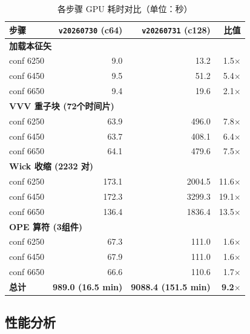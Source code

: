 \documentclass[12pt,a4paper]{ctexart}
\begin{document}
\begin{table}[H]
\centering
\caption{各步骤 GPU 耗时对比（单位：秒）}
\begin{tabular}{lrrr}
\toprule
步骤 & \texttt{v20260730} (c64) & \texttt{v20260731} (c128) & 比值 \\
\midrule
\multicolumn{4}{l}{\textbf{加载本征矢}} \\
\quad conf 6250 & 9.0 & 13.2 & 1.5$\times$ \\
\quad conf 6450 & 9.5 & 51.2 & 5.4$\times$ \\
\quad conf 6650 & 9.4 & 19.6 & 2.1$\times$ \\
\midrule
\multicolumn{4}{l}{\textbf{VVV 重子块 (72个时间片)}} \\
\quad conf 6250 & 63.9 & 496.0 & 7.8$\times$ \\
\quad conf 6450 & 63.7 & 408.1 & 6.4$\times$ \\
\quad conf 6650 & 64.1 & 479.6 & 7.5$\times$ \\
\midrule
\multicolumn{4}{l}{\textbf{Wick 收缩 (2232 对)}} \\
\quad conf 6250 & 173.1 & 2004.5 & 11.6$\times$ \\
\quad conf 6450 & 172.3 & 3299.3 & 19.1$\times$ \\
\quad conf 6650 & 136.4 & 1836.4 & 13.5$\times$ \\
\midrule
\multicolumn{4}{l}{\textbf{OPE 算符 (3组件)}} \\
\quad conf 6250 & 67.3 & 111.0 & 1.6$\times$ \\
\quad conf 6450 & 67.9 & 111.0 & 1.6$\times$ \\
\quad conf 6650 & 66.6 & 110.6 & 1.7$\times$ \\
\midrule
\textbf{总计} & \textbf{989.0 (16.5 min)} & \textbf{9088.4 (151.5 min)} & \textbf{9.2$\times$} \\
\bottomrule
\end{tabular}
\end{table}

\subsection{性能分析}
\end{document}
